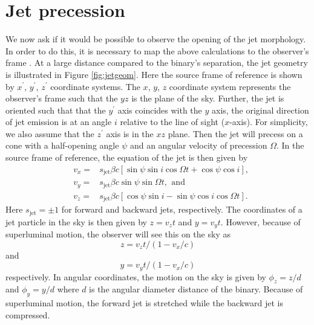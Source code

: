 \documentclass[iop]{emulateapj}
\begin{document}
\section{Jet precession}

We now ask if it would be possible to observe the opening of the jet
morphology.  In order to do this, it is necessary to map the above
calculations to the observer's frame \citep{1982ApJ...262..478G}.  At
a large distance compared to the binary's separation, the jet geometry
is illustrated in Figure \ref{fig:jetgeom}.  Here the source frame of
reference is shown by $x^\prime$, $y^\prime$, $z^\prime$ coordinate
systems.  The $x$, $y$, $z$ coordinate system represents the
observer's frame such that the $yz$ is the plane of the sky.  Further,
the jet is oriented such that that the $y^\prime$ axis coincides with
the $y$ axis, the original direction of jet emission is at an angle
$i$ relative to the line of sight ($x$-axis).  For simplicity, we also
assume that the $z^\prime$ axis is in the $xz$ plane.  Then the jet
will precess on a cone with a half-opening angle $\psi$ and an angular
velocity of precession $\Omega$.  In the source frame of reference,
the equation of the jet is then given by \citep{1981ApJ...246L.141H}
\begin{eqnarray}
  &v_x=&s_\mathrm{jet}\beta c\left[\sin\psi\sin i\cos\Omega t+\cos\psi\cos i\right],\\
  &v_y=&s_\mathrm{jet}\beta c\sin\psi\sin\Omega t,~\,\mathrm{and}\\
  &v_z=&s_\mathrm{jet}\beta c\left[\cos\psi\sin i-\sin\psi\cos i\cos\Omega t\right]. 
\end{eqnarray}
Here $s_\mathrm{jet}=\pm 1$ for forward and backward jets,
respectively.  The coordinates of a jet particle in the sky is then
given by $z=v_zt$ and $y=v_yt$.  However, because of superluminal
motion, the observer will see this on the sky as
\begin{equation}
  z=v_zt/(1-v_x/c)
\end{equation}
and
\begin{equation}
  y=v_yt/(1-v_x/c)
\end{equation}
respectively.  In angular coordinates, the motion on the sky is given
by $\phi_z=z/d$ and $\phi_y=y/d$ where $d$ is the angular diameter
distance of the binary.  Because of superluminal motion, the forward
jet is stretched while the backward jet is compressed.
\end{document}
